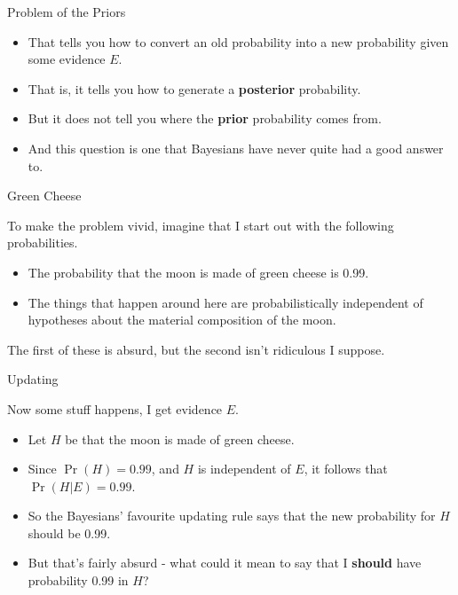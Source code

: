 \documentclass[
  ignorenonframetext,
]{beamer}
\providecommand{\tightlist}{%
  \setlength{\itemsep}{0pt}\setlength{\parskip}{0pt}}
\renewcommand{\,}{\text{, }}
\begin{document}
\begin{frame}{Problem of the Priors}
\protect\hypertarget{problem-of-the-priors}{}

\begin{itemize}
\tightlist
\item
  That tells you how to convert an old probability into a new
  probability given some evidence \(E\).
\item
  That is, it tells you how to generate a \textbf{posterior}
  probability. \pause
\item
  But it does not tell you where the \textbf{prior} probability comes
  from.
\item
  And this question is one that Bayesians have never quite had a good
  answer to.
\end{itemize}

\end{frame}

\begin{frame}{Green Cheese}
\protect\hypertarget{green-cheese}{}

To make the problem vivid, imagine that I start out with the following
probabilities.

\begin{itemize}
\tightlist
\item
  The probability that the moon is made of green cheese is 0.99.
\item
  The things that happen around here are probabilistically independent
  of hypotheses about the material composition of the moon.
\end{itemize}

The first of these is absurd, but the second isn't ridiculous I suppose.

\end{frame}

\begin{frame}{Updating}
\protect\hypertarget{updating-1}{}

Now some stuff happens, I get evidence \(E\).

\begin{itemize}
\tightlist
\item
  Let \(H\) be that the moon is made of green cheese.
\item
  Since \(\Pr(H) = 0.99\), and \(H\) is independent of \(E\), it follows
  that \(\Pr(H | E) = 0.99\). \pause
\item
  So the Bayesians' favourite updating rule says that the new
  probability for \(H\) should be 0.99. \pause
\item
  But that's fairly absurd - what could it mean to say that I
  \textbf{should} have probability 0.99 in \(H\)?
\end{itemize}

\end{frame}
\end{document}
